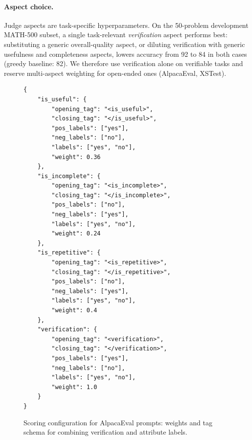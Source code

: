 \documentclass[letterpaper]{article} %
\begin{document}
\textcolor{orange!85!black}{\paragraph{Aspect choice.} Judge aspects are task-specific hyperparameters. On the 50-problem development MATH-500 subset, a single task-relevant \emph{verification} aspect performs best: substituting a generic overall-quality aspect, or diluting verification with generic usefulness and completeness aspects, lowers accuracy from 92 to 84 in both cases (greedy baseline: 82). We therefore use verification alone on verifiable tasks and reserve multi-aspect weighting for open-ended ones (AlpacaEval, XSTest).}


\begin{figure}[htbp]
\centering
\begin{minipage}{\linewidth}
\begin{footnotesize}
\begin{verbatim}
{
    "is_useful": {
        "opening_tag": "<is_useful>",
        "closing_tag": "</is_useful>",
        "pos_labels": ["yes"],
        "neg_labels": ["no"],
        "labels": ["yes", "no"],
        "weight": 0.36
    },
    "is_incomplete": {
        "opening_tag": "<is_incomplete>",
        "closing_tag": "</is_incomplete>",
        "pos_labels": ["no"],
        "neg_labels": ["yes"],
        "labels": ["yes", "no"],
        "weight": 0.24
    },
    "is_repetitive": {
        "opening_tag": "<is_repetitive>",
        "closing_tag": "</is_repetitive>",
        "pos_labels": ["no"],
        "neg_labels": ["yes"],
        "labels": ["yes", "no"],
        "weight": 0.4
    },
    "verification": {
        "opening_tag": "<verification>",
        "closing_tag": "</verification>",
        "pos_labels": ["yes"],
        "neg_labels": ["no"],
        "labels": ["yes", "no"],
        "weight": 1.0
    }
}
\end{verbatim}
\end{footnotesize}
\end{minipage}
\caption{Scoring configuration for AlpacaEval prompts: weights and tag schema for combining verification and attribute labels.}
\label{fig:appendix-qwen-alpaca-config}
\end{figure}
\end{document}
